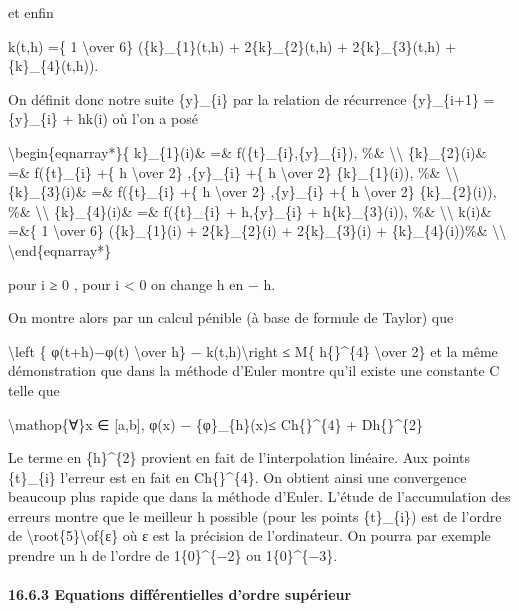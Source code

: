 \documentclass[]{article}
\begin{document}
et enfin

k(t,h) =\{ 1 \textbackslash{}over 6\} (\{k\}\_\{1\}(t,h) +
2\{k\}\_\{2\}(t,h) + 2\{k\}\_\{3\}(t,h) + \{k\}\_\{4\}(t,h)).

On définit donc notre suite \{y\}\_\{i\} par la relation de récurrence
\{y\}\_\{i+1\} = \{y\}\_\{i\} + hk(i) où l'on a posé

\textbackslash{}begin\{eqnarray*\}\{ k\}\_\{1\}(i)\& =\&
f(\{t\}\_\{i\},\{y\}\_\{i\}), \%\& \textbackslash{}\textbackslash{}
\{k\}\_\{2\}(i)\& =\& f(\{t\}\_\{i\} +\{ h \textbackslash{}over 2\}
,\{y\}\_\{i\} +\{ h \textbackslash{}over 2\} \{k\}\_\{1\}(i)), \%\&
\textbackslash{}\textbackslash{} \{k\}\_\{3\}(i)\& =\& f(\{t\}\_\{i\}
+\{ h \textbackslash{}over 2\} ,\{y\}\_\{i\} +\{ h \textbackslash{}over
2\} \{k\}\_\{2\}(i)), \%\& \textbackslash{}\textbackslash{}
\{k\}\_\{4\}(i)\& =\& f(\{t\}\_\{i\} + h,\{y\}\_\{i\} +
h\{k\}\_\{3\}(i)), \%\& \textbackslash{}\textbackslash{} k(i)\& =\&\{ 1
\textbackslash{}over 6\} (\{k\}\_\{1\}(i) + 2\{k\}\_\{2\}(i) +
2\{k\}\_\{3\}(i) + \{k\}\_\{4\}(i))\%\& \textbackslash{}\textbackslash{}
\textbackslash{}end\{eqnarray*\}

pour i ≥ 0 , pour i \textless{} 0 on change h en − h.

On montre alors par un calcul pénible (à base de formule de Taylor) que

\textbackslash{}left \textbar{}\{ φ(t+h)−φ(t) \textbackslash{}over h\} −
k(t,h)\textbackslash{}right \textbar{}≤ M\{
\textbar{}h\{\textbar{}\}\^{}\{4\} \textbackslash{}over 2\} et la même
démonstration que dans la méthode d'Euler montre qu'il existe une
constante C telle que

\textbackslash{}mathop\{∀\}x ∈ {[}a,b{]}, \textbar{}φ(x) −
\{φ\}\_\{h\}(x)\textbar{}≤ C\textbar{}h\{\textbar{}\}\^{}\{4\} +
D\textbar{}h\{\textbar{}\}\^{}\{2\}

Le terme en \{h\}\^{}\{2\} provient en fait de l'interpolation linéaire.
Aux points \{t\}\_\{i\} l'erreur est en fait en
C\textbar{}h\{\textbar{}\}\^{}\{4\}. On obtient ainsi une convergence
beaucoup plus rapide que dans la méthode d'Euler. L'étude de
l'accumulation des erreurs montre que le meilleur h possible (pour les
points \{t\}\_\{i\}) est de l'ordre de
\textbackslash{}root\{5\}\textbackslash{}of\{ε\} où ε est la précision
de l'ordinateur. On pourra par exemple prendre un h de l'ordre de
1\{0\}\^{}\{−2\} ou 1\{0\}\^{}\{−3\}.

\paragraph{16.6.3 Equations différentielles d'ordre supérieur}
\end{document}
